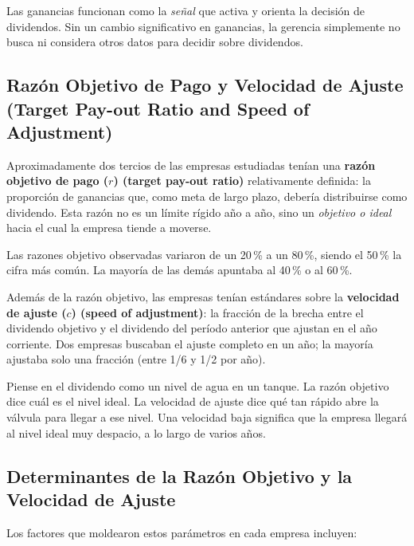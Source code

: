 \documentclass[12pt]{article}
\begin{document}
\begin{intuicion}
Las ganancias funcionan como la \textit{se\~nal} que activa y orienta la decisi\'on de
dividendos. Sin un cambio significativo en ganancias, la gerencia simplemente no busca
ni considera otros datos para decidir sobre dividendos.
\end{intuicion}

\subsection{Raz\'on Objetivo de Pago y Velocidad de Ajuste (Target Pay-out Ratio and Speed of Adjustment)}

Aproximadamente dos tercios de las empresas estudiadas ten\'ian una
\textbf{raz\'on objetivo de pago ($r$) (target pay-out ratio)} relativamente definida:
la proporci\'on de ganancias que, como meta de largo plazo, deber\'ia distribuirse como
dividendo. Esta raz\'on no es un l\'imite r\'igido a\~no a a\~no, sino un \textit{objetivo
o ideal} hacia el cual la empresa tiende a moverse.

Las razones objetivo observadas variaron de un 20\,\% a un 80\,\%, siendo el 50\,\% la
cifra m\'as com\'un. La mayor\'ia de las dem\'as apuntaba al 40\,\% o al 60\,\%.

Adem\'as de la raz\'on objetivo, las empresas ten\'ian est\'andares sobre la
\textbf{velocidad de ajuste ($c$) (speed of adjustment)}: la fracci\'on de la brecha entre
el dividendo objetivo y el dividendo del per\'iodo anterior que ajustan en el a\~no corriente.
Dos empresas buscaban el ajuste completo en un a\~no; la mayor\'ia ajustaba solo una fracci\'on
(entre 1/6 y 1/2 por a\~no).

\begin{intuicion}
Piense en el dividendo como un nivel de agua en un tanque. La raz\'on objetivo dice cu\'al
es el nivel ideal. La velocidad de ajuste dice qu\'e tan r\'apido abre la v\'alvula para
llegar a ese nivel. Una velocidad baja significa que la empresa llegar\'a al nivel ideal
muy despacio, a lo largo de varios a\~nos.
\end{intuicion}

\subsection{Determinantes de la Raz\'on Objetivo y la Velocidad de Ajuste}

Los factores que moldearon estos par\'ametros en cada empresa incluyen:
\end{document}
